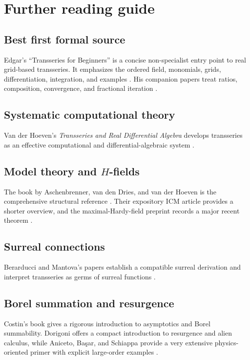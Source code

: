 \documentclass[11pt,oneside,openany]{book}
\theoremstyle{plain}
\theoremstyle{definition}
\theoremstyle{remark}
\begin{document}
\chapter{Further reading guide}
\label{app:reading}

\section{Best first formal source}
Edgar's ``Transseries for Beginners'' is a concise non-specialist entry point to real grid-based transseries. It emphasizes the ordered field, monomials, grids, differentiation, integration, and examples \cite{Edgar2010}. His companion papers treat ratios, composition, convergence, and fractional iteration \cite{EdgarRatios,EdgarComposition,EdgarFractional}.

\section{Systematic computational theory}
Van der Hoeven's \emph{Transseries and Real Differential Algebra} develops transseries as an effective computational and differential-algebraic system \cite{vdH2006}.

\section{Model theory and \texorpdfstring{$H$}{H}-fields}
The book by Aschenbrenner, van den Dries, and van der Hoeven is the comprehensive structural reference \cite{ADH2017}. Their expository ICM article provides a shorter overview, and the maximal-Hardy-field preprint records a major recent theorem \cite{ADHMaximal2024}.

\section{Surreal connections}
Berarducci and Mantova's papers establish a compatible surreal derivation and interpret transseries as germs of surreal functions \cite{BerarducciMantova2018,BerarducciMantovaGerms}.

\section{Borel summation and resurgence}
Costin's book gives a rigorous introduction to asymptotics and Borel summability. Dorigoni offers a compact introduction to resurgence and alien calculus, while Aniceto, Başar, and Schiappa provide a very extensive physics-oriented primer with explicit large-order examples \cite{Dorigoni,AnicetoBasarSchiappa}.
\end{document}

